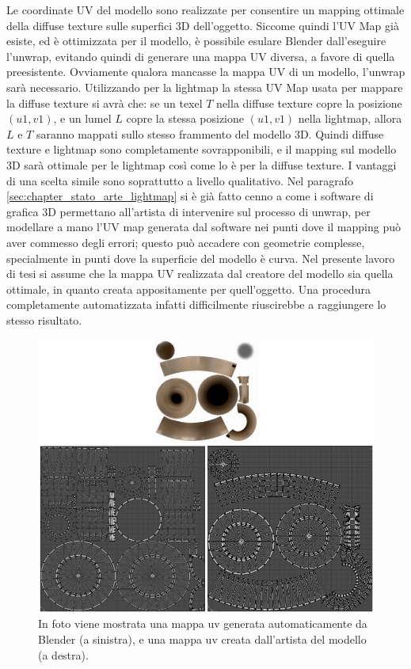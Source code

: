 Le coordinate UV del modello sono realizzate per consentire un mapping ottimale della diffuse texture sulle superfici 3D dell’oggetto. Siccome quindi l’UV Map già esiste, ed è ottimizzata per il modello, è possibile esulare Blender dall’eseguire l’unwrap, evitando quindi di generare una mappa UV diversa, a favore di quella preesistente. 
Ovviamente qualora mancasse la mappa UV di un modello, l’unwrap sarà necessario. 
Utilizzando per la lightmap la stessa UV Map usata per mappare la diffuse texture si avrà che:  se un texel $T$ nella diffuse texture copre la posizione $(u1,v1)$, e un lumel $L$ copre la stessa posizione $(u1,v1)$ nella lightmap, allora $L$ e $T$ saranno mappati sullo stesso frammento del modello 3D.
Quindi diffuse texture e lightmap sono completamente sovrapponibili, e il mapping sul modello 3D sarà ottimale per le lightmap così come lo è per la diffuse texture.
I vantaggi di una scelta simile sono soprattutto a livello qualitativo. 
Nel paragrafo \ref{sec:chapter_stato_arte_lightmap} si è già fatto cenno a come i software di grafica 3D permettano all’artista di intervenire sul processo di unwrap, per modellare a mano l’UV map generata dal software nei punti dove il mapping può aver commesso degli errori; questo può accadere con geometrie complesse, specialmente in punti dove la superficie del modello è curva. 
Nel presente lavoro di tesi si assume che la mappa UV realizzata dal creatore del modello sia quella ottimale, in quanto creata appositamente per quell’oggetto. Una procedura completamente automatizzata infatti difficilmente riuscirebbe a raggiungere lo stesso risultato.
\\
\begin{figure}[htb]
 \centering
 \includegraphics[width=1\linewidth]{images/chapter_lrl/lrl_diff_uvmap.png}\hfill
 \caption[Confronto UV Map]{In foto viene mostrata una mappa uv generata automaticamente da Blender (a sinistra), e una mappa uv creata dall'artista del modello (a destra).}
 \label{fig:lrl_diff_uvmap}
\end{figure}
